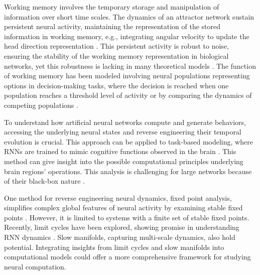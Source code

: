 \documentclass[12pt,letterpaper, onecolumn]{article}
\theoremstyle{definition}
\theoremstyle{remark}
\begin{document}
Working memory involves the temporary storage and manipulation of information over short time scales. The dynamics of an attractor network sustain persistent neural activity, maintaining the representation of the stored information in working memory, e.g., integrating angular velocity to update the head direction representation \citep{barak2013, barak2014, durstewitz2000, wolpert1995, goncalves2014, burak2009, goldman2007, aksay2007, noorman2022, cueva2021a, cueva2021b}. This persistent activity is robust to noise, ensuring the stability of the working memory representation \citep{panichello2019, koulakov2002} in biological networks, yet this robustness is lacking in many theoretical models \citep{renart2003, seeholzer2019, machens2008}.
The function of working memory has been modeled involving neural populations representing options in decision-making tasks, where the decision is reached when one population reaches a threshold level of activity or by comparing the dynamics of competing populations \citep{wong2007, wong2008, hocker2024}.

To understand how artificial neural networks compute and generate behaviors, accessing the underlying neural states and reverse engineering their temporal evolution is crucial. This approach can be applied to task-based modeling, where RNNs are trained to mimic cognitive functions observed in the brain \citep{darshan2022, barak2017recurrent, durstewitz2023reconstructing}. This method can give insight into the possible computational principles underlying brain regions' operations. This analysis is challenging for large networks because of their black-box nature \citep{lipton2018, erasmus2021}.


One method for reverse engineering neural dynamics, fixed point analysis, simplifies complex global features of neural activity by examining stable fixed points \citep{sussillo2013blackbox, sussillo2014, beer2018, maheswaranathan2019universality, driscoll2022, mante2013context}. However, it is limited to systems with a finite set of stable fixed points. Recently, limit cycles have been explored, showing promise in understanding RNN dynamics \citep{pals2024}. Slow manifolds, capturing multi-scale dynamics, also hold potential. Integrating insights from limit cycles and slow manifolds into computational models could offer a more comprehensive framework for studying neural computation.
\end{document}
